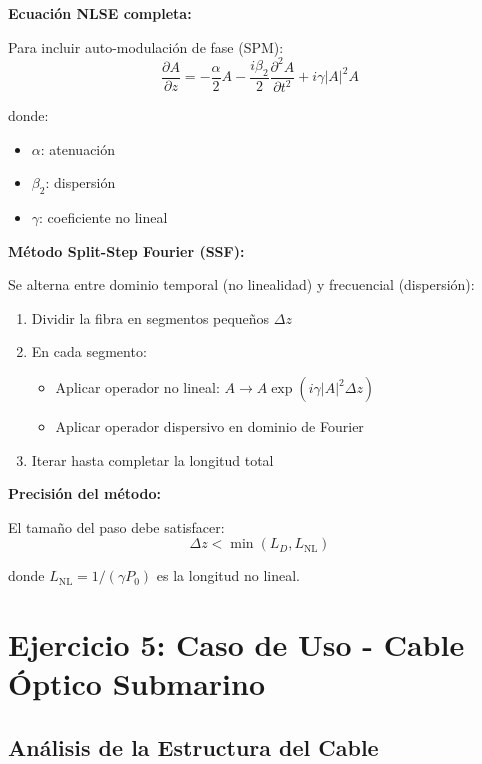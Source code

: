 \documentclass[11pt,a4paper]{article}
\begin{document}
\textbf{Ecuación NLSE completa:}

Para incluir auto-modulación de fase (SPM):
\begin{equation}
    \frac{\partial A}{\partial z} = -\frac{\alpha}{2}A - \frac{i\beta_2}{2}\frac{\partial^2 A}{\partial t^2} + i\gamma|A|^2A
\end{equation}

donde:
\begin{itemize}
    \item $\alpha$: atenuación
    \item $\beta_2$: dispersión
    \item $\gamma$: coeficiente no lineal
\end{itemize}

\textbf{Método Split-Step Fourier (SSF):}

Se alterna entre dominio temporal (no linealidad) y frecuencial (dispersión):
\begin{enumerate}
    \item Dividir la fibra en segmentos pequeños $\Delta z$
    \item En cada segmento:
    \begin{itemize}
        \item Aplicar operador no lineal: $A \rightarrow A \exp(i\gamma|A|^2\Delta z)$
        \item Aplicar operador dispersivo en dominio de Fourier
    \end{itemize}
    \item Iterar hasta completar la longitud total
\end{enumerate}

\textbf{Precisión del método:}

El tamaño del paso debe satisfacer:
\begin{equation}
    \Delta z < \min(L_D, L_{\text{NL}})
\end{equation}

donde $L_{\text{NL}} = 1/(\gamma P_0)$ es la longitud no lineal.

\section{Ejercicio 5: Caso de Uso - Cable Óptico Submarino}

\subsection{Análisis de la Estructura del Cable}
\end{document}
